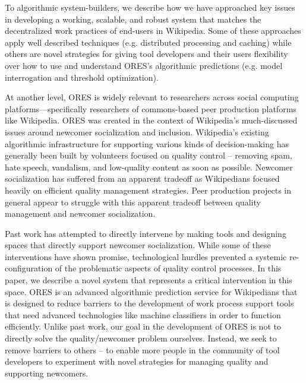 To algorithmic system-builders, we describe how we have approached key issues in developing a working, scalable, and robust system that matches the decentralized work practices of end-users in Wikipedia.  Some of these approaches apply well described techniques (e.g. distributed processing and caching) while others are novel strategies for giving tool developers and their users flexibility over how to use and understand ORES's algorithmic predictions (e.g. model interrogation and threshold optimization).

At another level, ORES is widely relevant to researchers across social computing platforms---specifically researchers of commons-based peer production platforms like Wikipedia. ORES was created in the context of Wikipedia's much-discussed issues around newcomer socialization and inclusion\cite{halfaker2013rise}. Wikipedia's existing algorithmic infrastructure for supporting various kinds of decision-making has generally been built by volunteers focused on quality control -- removing spam, hate speech, vandalism, and low-quality content as soon as possible. Newcomer socialization has suffered from an apparent tradeoff as Wikipedians focused heavily on efficient quality management strategies\cite{halfaker2013rise, halfaker2014snuggle}. Peer production projects in general appear to struggle with this apparent tradeoff between quality management and newcomer socialization\cite{teblunthuis2018revisiting}.

Past work has attempted to directly intervene by making tools\cite{halfaker2014snuggle} and designing spaces\cite{morgan2013tea} that directly support newcomer socialization.  While some of these interventions have shown promise\cite{morgan2018evaluating}, technological hurdles prevented a systemic re-configuration of the problematic aspects of quality control processes\cite{halfaker2014snuggle}. In this paper, we describe a novel system that represents a critical intervention in this space.  ORES is an advanced algorithmic prediction service for Wikipedians that is designed to reduce barriers to the development of work process support tools that need advanced technologies like machine classifiers in order to function efficiently. Unlike past work, our goal in the development of ORES is not to directly solve the quality/newcomer problem ourselves.  Instead, we seek to remove barriers to others -- to enable more people in the community of tool developers to experiment with novel strategies for managing quality and supporting newcomers.


